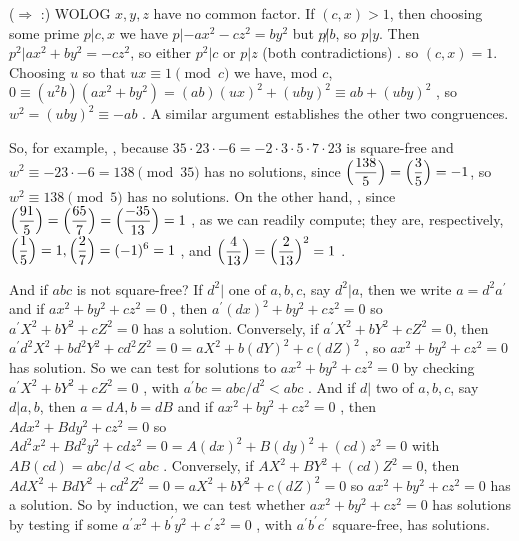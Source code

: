 \ssk


\msk



\msk

($\Rightarrow$ :) WOLOG $x,y,z$ have no common factor. If $(c,x)>1$, then choosing
some prime $p|c,x$ we have $p|-ax^2-cz^2=by^2$ but $p\not |b$, so $p|y$. Then 
$p^2|ax^2+by^2=-cz^2$, so either $p^2|c$ or $p|z$ (both contradictions) . so $(c,x)=1$.
Choosing $u$ so that $ux\equiv 1\pmod{c}$ we have, mod $c$, 
$0\equiv (u^2b)(ax^2+by^2) = (ab)(ux)^2+(uby)^2\equiv ab+(uby)^2$ , so $w^2=(uby)^2\equiv -ab$ .
A similar argument establishes the other two congruences.

\msk

So, for example, ,
because $35\cdot 23\cdot -6 = -2\cdot 3\cdot 5\cdot 7\cdot 23$ is square-free 
and $w^2\equiv -23\cdot -6 = 138\pmod{35}$ has no solutions,
since $\displaystyle \Big({{138}\over{5}}\Big) = \displaystyle \Big({{3}\over{5}}\Big) = -1$, 
so $w^2\equiv 138\pmod{5}$ has no solutions.
\hhsk On the other hand, \hhsk
{}, since 
$\displaystyle \Big({{91}\over{5}}\Big)=\Big({{65}\over{7}}\Big)=\Big({{-35}\over{13}}\Big)=1$ , as we can readily compute;
they are, respectively, $\displaystyle \Big({{1}\over{5}}\Big)=1 , \Big({{2}\over{7}}\Big)=(-1)^6=1$ , and 
$\displaystyle \Big({{4}\over{13}}\Big) = \Big({{2}\over{13}}\Big)^2=1$ .

\msk

And if $abc$ is not square-free? If $d^2|$ one of $a,b,c$, say $d^2|a$, then we write
$a=d^2a^\prime$ and if $ax^2+by^2+cz^2=0$ , then $a^\prime(dx)^2+by^2+cz^2=0$ 
so $a^\prime X^2+bY^2+cZ^2=0$ has a solution. Conversely, if $a^\prime X^2+bY^2+cZ^2=0$,
then $a^\prime d^2X^2+bd^2Y^2+cd^2Z^2=0 = aX^2+b(dY)^2+c(dZ)^2$ , so $ax^2+by^2+cz^2=0$
has  solution. So we can test for solutions to $ax^2+by^2+cz^2=0$ by checking $a^\prime X^2+bY^2+cZ^2=0$ ,
with $a^\prime bc = abc/d^2 < abc$ .
And if $d|$ two of $a,b,c$, say $d|a,b$, then $a=dA,b=dB$ and if 
$ax^2+by^2+cz^2=0$ , then $Adx^2+Bdy^2+cz^2=0$ so $Ad^2x^2+Bd^2y^2+cdz^2=0 = A(dx)^2+B(dy)^2+(cd)z^2=0$ 
with $AB(cd) = abc/d < abc$ . Conversely, if $AX^2+BY^2+(cd)Z^2=0$, then 
$AdX^2+BdY^2+cd^2Z^2=0 = aX^2+bY^2+c(dZ)^2=0$ so $ax^2+by^2+cz^2=0$
has a solution. So by induction, we can test whether $ax^2+by^2+cz^2=0$ has solutions
by testing if some $a^\prime x^2+b^\prime y^2+c^\prime z^2=0$ , with $a^\prime b^\prime c^\prime$ square-free,
has solutions. 


